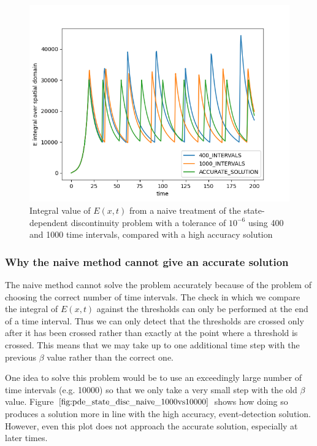 \documentclass{article}
\begin{document}
\begin{figure}[H]
\centering
\includegraphics[width=0.7\linewidth]{./figures/pde_state_disc_naive_400vs1000}
\caption{Integral value of $E(x, t)$ from a naive treatment of the state-dependent discontinuity problem with a tolerance of $10^{-6}$ using 400 and 1000 time intervals, compared with a high accuracy solution}
\label{fig:pde_state_disc_naive_400vs1000}
\end{figure}

\subsubsection{Why the naive method cannot give an accurate solution}
\label{subsubsection:pde_state_naive_always_inaccurate}
The naive method cannot solve the problem accurately because of the problem of choosing the correct number of time intervals. The check in which we compare the integral of $E(x, t)$ against the thresholds can only be performed at the end of a time interval. Thus we can only detect that the thresholds are crossed only after it has been crossed rather than exactly at the point where a threshold is crossed. This means that we may take up to one additional time step with the previous $\beta$ value rather than the correct one.

One idea to solve this problem would be to use an exceedingly large number of time intervals (e.g. 10000) so that we only take a very small step with the old $\beta$ value. Figure $\ref{fig:pde_state_disc_naive_1000vs10000}$ shows how doing so produces a solution more in line with the high accuracy, event-detection solution. However, even this plot does not approach the accurate solution, especially at later times. 
\end{document}
